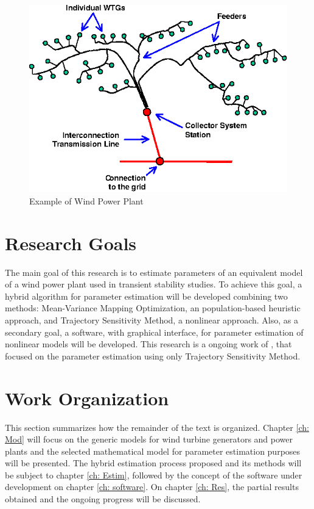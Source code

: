 \begin{figure}[h]
	\caption{Example of Wind Power Plant}
	\begin{center}
		\includegraphics[scale=1.25]{Images/WPP.eps}
	\end{center}
	\label{fig: WPP}
\end{figure}

\section{Research Goals}

The main goal of this research is to estimate parameters of an equivalent model of a wind power plant used in transient stability studies. To achieve this goal, a hybrid algorithm for parameter estimation will be developed combining two methods: Mean-Variance Mapping Optimization, an population-based heuristic approach, and Trajectory Sensitivity Method, a nonlinear approach. Also, as a secondary goal, a software, with graphical interface, for parameter estimation of nonlinear models will be developed. This research is a ongoing work of \cite{Cari2015}, that focused on the parameter estimation using only Trajectory Sensitivity Method.

\section{Work Organization}

This section summarizes how the remainder of the text is organized. Chapter \ref{ch: Mod} will focus on the generic models for wind turbine generators and power plants and the selected mathematical model for parameter estimation purposes will be presented. The hybrid estimation process proposed and its methods will be subject to chapter \ref{ch: Estim}, followed by the concept of the software under development on chapter \ref{ch: software}. On chapter \ref{ch: Res}, the partial results obtained and the ongoing progress will be discussed.